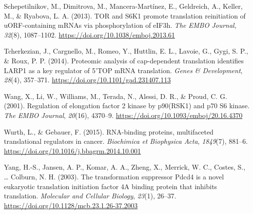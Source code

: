 \documentclass[12pt,openany]{book}
\begin{document}
\hypertarget{ref-Schepetilnikov2013}{}
Schepetilnikov, M., Dimitrova, M., Mancera-Martínez, E., Geldreich, A.,
Keller, M., \& Ryabova, L. A. (2013). TOR and S6K1 promote translation
reinitiation of uORF-containing mRNAs via phosphorylation of eIF3h.
\emph{The EMBO Journal}, \emph{32}(8), 1087--1102.
\url{https://doi.org/10.1038/emboj.2013.61}

\hypertarget{ref-Tcherkezian2014}{}
Tcherkezian, J., Cargnello, M., Romeo, Y., Huttlin, E. L., Lavoie, G.,
Gygi, S. P., \& Roux, P. P. (2014). Proteomic analysis of cap-dependent
translation identifies LARP1 as a key regulator of 5'TOP mRNA
translation. \emph{Genes \& Development}, \emph{28}(4), 357--371.
\url{https://doi.org/10.1101/gad.231407.113}

\hypertarget{ref-Wang2001}{}
Wang, X., Li, W., Williams, M., Terada, N., Alessi, D. R., \& Proud, C.
G. (2001). Regulation of elongation factor 2 kinase by p90(RSK1) and p70
S6 kinase. \emph{The EMBO Journal}, \emph{20}(16), 4370--9.
\url{https://doi.org/10.1093/emboj/20.16.4370}

\hypertarget{ref-Wurth2015}{}
Wurth, L., \& Gebauer, F. (2015). RNA-binding proteins, multifaceted
translational regulators in cancer. \emph{Biochimica et Biophysica
Acta}, \emph{1849}(7), 881--6.
\url{https://doi.org/10.1016/j.bbagrm.2014.10.001}

\hypertarget{ref-Yang2003}{}
Yang, H.-S., Jansen, A. P., Komar, A. A., Zheng, X., Merrick, W. C.,
Costes, S., \ldots{} Colburn, N. H. (2003). The transformation
suppressor Pdcd4 is a novel eukaryotic translation initiation factor 4A
binding protein that inhibits translation. \emph{Molecular and Cellular
Biology}, \emph{23}(1), 26--37.
\url{https://doi.org/10.1128/mcb.23.1.26-37.2003}
\end{document}
